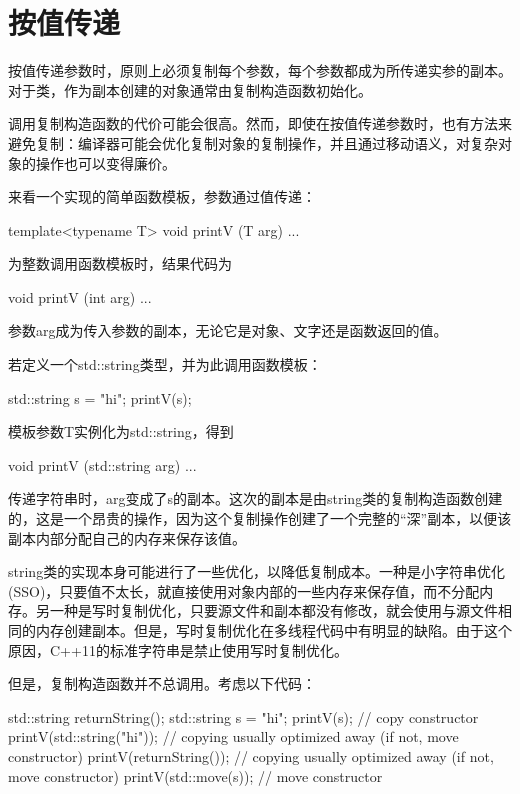\section{按值传递}
按值传递参数时，原则上必须复制每个参数，每个参数都成为所传递实参的副本。对于类，作为副本创建的对象通常由复制构造函数初始化。

调用复制构造函数的代价可能会很高。然而，即使在按值传递参数时，也有方法来避免复制：编译器可能会优化复制对象的复制操作，并且通过移动语义，对复杂对象的操作也可以变得廉价。

来看一个实现的简单函数模板，参数通过值传递：

\begin{cpp}
template<typename T>
void printV (T arg) {
	...
}
\end{cpp}

为整数调用函数模板时，结果代码为

\begin{cpp}
void printV (int arg) {
	...
}
\end{cpp}

参数arg成为传入参数的副本，无论它是对象、文字还是函数返回的值。

若定义一个std::string类型，并为此调用函数模板：

\begin{cpp}
std::string s = "hi";
printV(s);
\end{cpp}

模板参数T实例化为std::string，得到

\begin{cpp}
void printV (std::string arg)
{
	...
}
\end{cpp}

传递字符串时，arg变成了s的副本。这次的副本是由string类的复制构造函数创建的，这是一个昂贵的操作，因为这个复制操作创建了一个完整的“深”副本，以便该副本内部分配自己的内存来保存该值。

\begin{notice}
string类的实现本身可能进行了一些优化，以降低复制成本。一种是小字符串优化(SSO)，只要值不太长，就直接使用对象内部的一些内存来保存值，而不分配内存。另一种是写时复制优化，只要源文件和副本都没有修改，就会使用与源文件相同的内存创建副本。但是，写时复制优化在多线程代码中有明显的缺陷。由于这个原因，C++11的标准字符串是禁止使用写时复制优化。
\end{notice}

但是，复制构造函数并不总调用。考虑以下代码：

\begin{cpp}
std::string returnString();
std::string s = "hi";
printV(s); // copy constructor
printV(std::string("hi")); // copying usually optimized away (if not, move constructor)
printV(returnString()); // copying usually optimized away (if not, move constructor)
printV(std::move(s)); // move constructor
\end{cpp}

